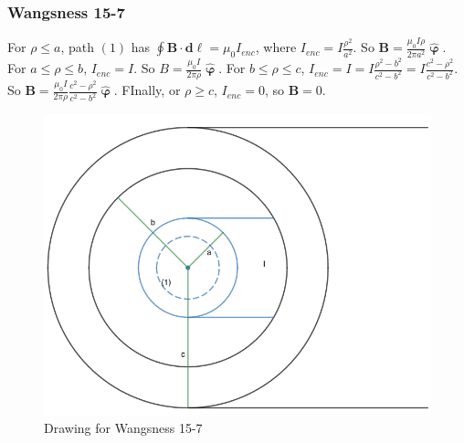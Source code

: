 \documentclass[crop=false,class=article,oneside]{standalone}
\begin{document}
        \subsubsection{Wangsness 15-7}
        For $\rho\leq a$, path $(1)$ has $\oint \mathbf{B}\cdot \mathbf{d\ell}= \mu_0 I_{enc}$, where $I_{enc} = I\frac{\rho^2}{a^2}$. So $\mathbf{B} = \frac{\mu_0 I\rho}{2\pi a^2} \hat{\boldsymbol{\upvarphi}}$. For $a\leq \rho \leq b$, $I_{enc} = I$. So $B = \frac{\mu_0 I}{2\pi \rho} \hat{\boldsymbol{\upvarphi}}$. For $b\leq \rho \leq c$, $I_{enc} = I =I\frac{\rho^2-b^2}{c^2-b^2} = I\frac{c^2-\rho^2}{c^2-b^2}$. So $\mathbf{B} = \frac{\mu_0 I}{2\pi \rho} \frac{c^2-\rho^2}{c^2-b^2}\hat{\boldsymbol{\upvarphi}}$. FInally, or $\rho \geq c$, $I_{enc} = 0$, so $\mathbf{B} = 0$.
        \begin{figure}[htbp]
            \centering
            \captionsetup{type=figure}
            \includegraphics[scale=0.4]{15-7.png}
            \caption{Drawing for Wangsness 15-7}
        \end{figure}
\end{document}
